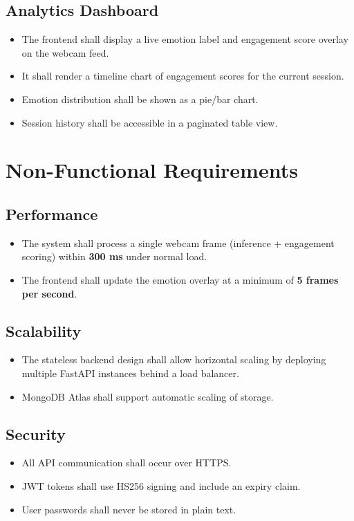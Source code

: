 \subsection{Analytics Dashboard}
\begin{itemize}
    \item The frontend shall display a live emotion label and engagement
          score overlay on the webcam feed.
    \item It shall render a timeline chart of engagement scores for the
          current session.
    \item Emotion distribution shall be shown as a pie/bar chart.
    \item Session history shall be accessible in a paginated table view.
\end{itemize}

\section{Non-Functional Requirements}

\subsection{Performance}
\begin{itemize}
    \item The system shall process a single webcam frame (inference +
          engagement scoring) within \textbf{300 ms} under normal load.
    \item The frontend shall update the emotion overlay at a minimum of
          \textbf{5 frames per second}.
\end{itemize}

\subsection{Scalability}
\begin{itemize}
    \item The stateless backend design shall allow horizontal scaling by
          deploying multiple FastAPI instances behind a load balancer.
    \item MongoDB Atlas shall support automatic scaling of storage.
\end{itemize}

\subsection{Security}
\begin{itemize}
    \item All API communication shall occur over HTTPS.
    \item JWT tokens shall use HS256 signing and include an expiry claim.
    \item User passwords shall never be stored in plain text.
\end{itemize}

